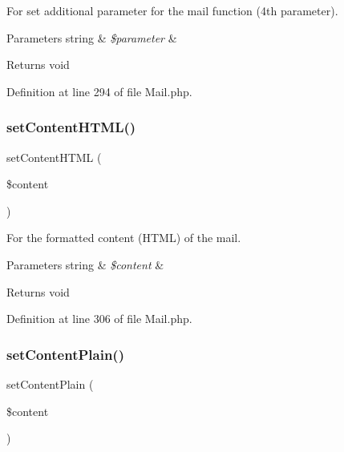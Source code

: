 For set additional parameter for the mail function (4th parameter).


\begin{DoxyParams}[1]{Parameters}
string & {\em \$parameter} & \\
\hline
\end{DoxyParams}
\begin{DoxyReturn}{Returns}
void 
\end{DoxyReturn}


Definition at line 294 of file Mail.\+php.

\mbox{\label{class_zest_1_1_mail_1_1_mail_a72cc5793eec52f5f7d25048e7e7c11cf}} 
\subsubsection{\texorpdfstring{set\+Content\+H\+T\+M\+L()}{setContentHTML()}}
{\footnotesize\ttfamily set\+Content\+H\+T\+ML (\begin{DoxyParamCaption}\item[{}]{\$content }\end{DoxyParamCaption})}

For the formatted content (H\+T\+ML) of the mail.


\begin{DoxyParams}[1]{Parameters}
string & {\em \$content} & \\
\hline
\end{DoxyParams}
\begin{DoxyReturn}{Returns}
void 
\end{DoxyReturn}


Definition at line 306 of file Mail.\+php.

\mbox{\label{class_zest_1_1_mail_1_1_mail_acc1f3676088abeb7ce453636940cde91}} 
\subsubsection{\texorpdfstring{set\+Content\+Plain()}{setContentPlain()}}
{\footnotesize\ttfamily set\+Content\+Plain (\begin{DoxyParamCaption}\item[{}]{\$content }\end{DoxyParamCaption})}

